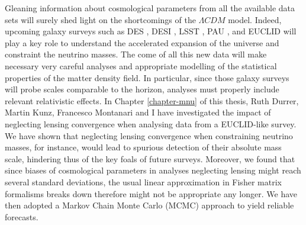 Gleaning information about cosmological parameters from all the available data sets will surely shed light on the shortcomings of the $\Lambda CDM$ model. Indeed, upcoming galaxy surveys such as DES , DESI , LSST , PAU , and EUCLID  will play a key role to understand the accelerated expansion of the universe and constraint the neutrino masses. The come of all this new data will make necessary very careful analyses and appropriate modelling of the statistical properties of the matter density field. In particular, since those galaxy surveys will probe scales comparable to the horizon, analyses must properly include relevant relativistic effects. In Chapter \ref{chapter-mnu} of this thesis, Ruth Durrer, Martin Kunz, Francesco Montanari and I have investigated the impact of neglecting lensing convergence when analysing data from a EUCLID-like survey. We have shown that neglecting lensing convergence when constraining neutrino masses, for instance, would lead to spurious detection of their absolute mass scale, hindering thus of the key foals of future surveys. Moreover, we found that since biases of cosmological parameters in analyses neglecting lensing might reach several standard deviations, the usual linear approximation in Fisher matrix formalisms breaks down therefore might not be appropriate any longer. We have then adopted a Markov Chain Monte Carlo (MCMC) approach to yield reliable forecasts.

